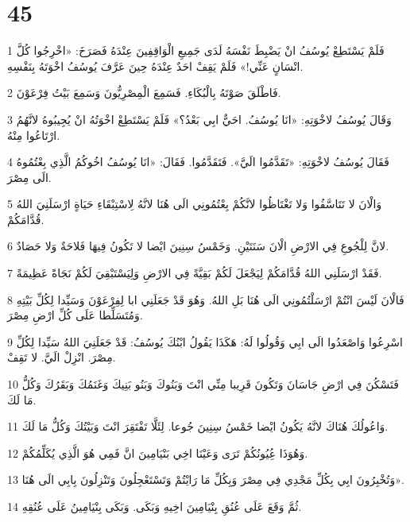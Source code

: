 \chapter{45}

\par 1 فَلَمْ يَسْتَطِعْ يُوسُفُ انْ يَضْبِطَ نَفْسَهُ لَدَى جَمِيعِ الْوَاقِفِينَ عِنْدَهُ فَصَرَخَ: «اخْرِجُوا كُلَّ انْسَانٍ عَنِّي!» فَلَمْ يَقِفْ احَدٌ عِنْدَهُ حِينَ عَرَّفَ يُوسُفُ اخْوَتَهُ بِنَفْسِهِ.
\par 2 فَاطْلَقَ صَوْتَهُ بِالْبُكَاءِ. فَسَمِعَ الْمِصْرِيُّونَ وَسَمِعَ بَيْتُ فِرْعَوْنَ.
\par 3 وَقَالَ يُوسُفُ لاخْوَتِهِ: «انَا يُوسُفُ. احَيٌّ ابِي بَعْدُ؟» فَلَمْ يَسْتَطِعْ اخْوَتُهُ انْ يُجِيبُوهُ لانَّهُمُ ارْتَاعُوا مِنْهُ.
\par 4 فَقَالَ يُوسُفُ لاخْوَتِهِ: «تَقَدَّمُوا الَيَّ». فَتَقَدَّمُوا. فَقَالَ: «انَا يُوسُفُ اخُوكُمُ الَّذِي بِعْتُمُوهُ الَى مِصْرَ.
\par 5 وَالْانَ لا تَتَاسَّفُوا وَلا تَغْتَاظُوا لانَّكُمْ بِعْتُمُونِي الَى هُنَا لانَّهُ لِاسْتِبْقَاءِ حَيَاةٍ ارْسَلَنِيَ اللهُ قُدَّامَكُمْ.
\par 6 لانَّ لِلْجُوعِ فِي الارْضِ الْانَ سَنَتَيْنِ. وَخَمْسُ سِنِينَ ايْضا لا تَكُونُ فِيهَا فَلاحَةٌ وَلا حَصَادٌ.
\par 7 فَقَدْ ارْسَلَنِي اللهُ قُدَّامَكُمْ لِيَجْعَلَ لَكُمْ بَقِيَّةً فِي الارْضِ وَلِيَسْتَبْقِيَ لَكُمْ نَجَاةً عَظِيمَةً.
\par 8 فَالْانَ لَيْسَ انْتُمْ ارْسَلْتُمُونِي الَى هُنَا بَلِ اللهُ. وَهُوَ قَدْ جَعَلَنِي ابا لِفِرْعَوْنَ وَسَيِّدا لِكُلِّ بَيْتِهِ وَمُتَسَلِّطا عَلَى كُلِّ ارْضِ مِصْرَ.
\par 9 اسْرِعُوا وَاصْعَدُوا الَى ابِي وَقُولُوا لَهُ: هَكَذَا يَقُولُ ابْنُكَ يُوسُفُ: قَدْ جَعَلَنِيَ اللهُ سَيِّدا لِكُلِّ مِصْرَ. انْزِلْ الَيَّ. لا تَقِفْ.
\par 10 فَتَسْكُنَ فِي ارْضِ جَاسَانَ وَتَكُونَ قَرِيبا مِنِّي انْتَ وَبَنُوكَ وَبَنُو بَنِيكَ وَغَنَمُكَ وَبَقَرُكَ وَكُلُّ مَا لَكَ.
\par 11 وَاعُولُكَ هُنَاكَ لانَّهُ يَكُونُ ايْضا خَمْسُ سِنِينَ جُوعا. لِئَلَّا تَفْتَقِرَ انْتَ وَبَيْتُكَ وَكُلُّ مَا لَكَ.
\par 12 وَهُوَذَا عُِيُونُكُمْ تَرَى وَعَيْنَا اخِي بَنْيَامِينَ انَّ فَمِي هُوَ الَّذِي يُكَلِّمُكُمْ.
\par 13 وَتُخْبِرُونَ ابِي بِكُلِّ مَجْدِي فِي مِصْرَ وَبِكُلِّ مَا رَايْتُمْ وَتَسْتَعْجِلُونَ وَتَنْزِلُونَ بِابِي الَى هُنَا».
\par 14 ثُمَّ وَقَعَ عَلَى عُنُقِ بِنْيَامِينَ اخِيهِ وَبَكَى. وَبَكَى بِنْيَامِينُ عَلَى عُنُقِهِ.
